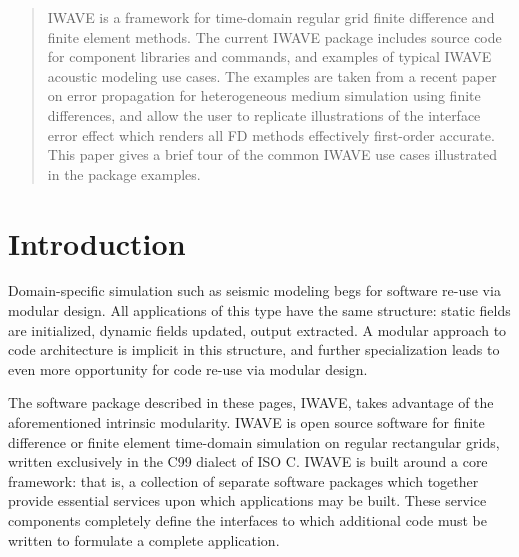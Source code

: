\begin{abstract}
  IWAVE is a framework for time-domain regular grid finite difference
  and finite element methods. The current IWAVE package includes
  source code for component libraries and commands, and 
  examples of typical IWAVE acoustic modeling use cases. The
  examples are taken from a recent paper on error propagation for
  heterogeneous medium simulation using finite differences, and allow
  the user to replicate illustrations of the interface error effect
  which renders all FD methods effectively first-order accurate.  This
  paper gives a brief tour of the common IWAVE use cases illustrated
  in the package examples.
\end{abstract}

\section{Introduction}
Domain-specific simulation such as seismic modeling begs for
software re-use via modular design. All applications of this type have
the same structure: static fields are initialized, dynamic fields
updated, output extracted. A modular approach to code architecture is
implicit in this structure, and further specialization leads to even more opportunity
for code re-use via modular design. 

The software package described in these pages, IWAVE, takes advantage
of the aforementioned intrinsic modularity. IWAVE is open source
software for finite difference or finite element time-domain
simulation on regular rectangular grids, written exclusively in the
C99 dialect of ISO C. IWAVE is built around a core framework: that is,
a collection of separate software packages which together provide
essential services upon which applications may be built. These
service components completely define the interfaces to which
additional code must be written to formulate a complete
application. 

